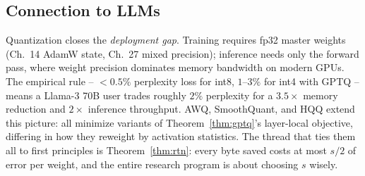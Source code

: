 \documentclass[11pt]{article}
\theoremstyle{remark}
\begin{document}
\subsection*{Connection to LLMs}

Quantization closes the \emph{deployment gap}. Training requires fp32 master weights (Ch.~14 AdamW state, Ch.~27 mixed precision); inference needs only the forward pass, where weight precision dominates memory bandwidth on modern GPUs. The empirical rule -- $<0.5\%$ perplexity loss for int8, $1$--$3\%$ for int4 with GPTQ -- means a Llama-3 70B user trades roughly $2\%$ perplexity for a $3.5\times$ memory reduction and $2\times$ inference throughput. AWQ, SmoothQuant, and HQQ extend this picture: all minimize variants of Theorem~\ref{thm:gptq}'s layer-local objective, differing in how they reweight by activation statistics. The thread that ties them all to first principles is Theorem~\ref{thm:rtn}: every byte saved costs at most $s/2$ of error per weight, and the entire research program is about choosing $s$ wisely.

\end{document}
